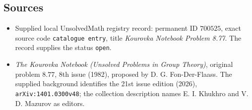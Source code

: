 \documentclass[11pt]{article}
\begin{document}
\subsection{Sources}
\begin{itemize}
\item Supplied local UnsolvedMath registry record: permanent ID \(700525\), exact source code \texttt{catalogue entry}, title \emph{Kourovka Notebook Problem 8.77}. The record supplies the status \texttt{open}.
\item \emph{The Kourovka Notebook (Unsolved Problems in Group Theory)}, original problem \(8.77\), 8th issue (1982), proposed by D. G. Fon-Der-Flaass. The supplied background identifies the 21st issue edition (2026), \texttt{arXiv:1401.0300v48}; the collection description names E. I. Khukhro and V. D. Mazurov as editors.
\end{itemize}
\end{document}
